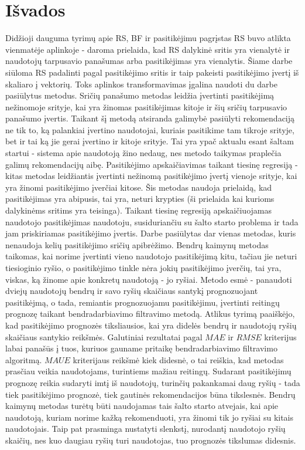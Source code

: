 \documentclass{VUMIFInfMagistrinis}
\begin{document}
\newpage
\section{Išvados}
Didžioji dauguma tyrimų apie RS, BF ir pasitikėjimu pagrįstas RS buvo atlikta vienmatėje aplinkoje - daroma prielaida, kad RS dalykinė sritis yra vienalytė ir naudotojų tarpusavio panašumas arba pasitikėjimas yra vienalytis. Šiame darbe siūloma RS padalinti pagal pasitikėjimo sritis ir taip pakeisti pasitikėjimo įvertį iš skaliaro į vektorių. Toks aplinkos transformavimas įgalina naudoti du darbe pasiūlytus metodus.
\newline
\indent
Sričių panašumo metodas leidžia įvertinti pasitikėjimą nežinomoje srityje, kai yra žinomas pasitikėjimas kitoje ir šių sričių tarpusavio panašumo įvertis. Taikant šį metodą atsiranda galimybė pasiūlyti rekomendaciją ne tik to, ką palankiai įvertino naudotojai, kuriais pasitikime tam tikroje srityje, bet ir tai ką jie gerai įvertino ir kitoje srityje. Tai yra ypač aktualu esant šaltam startui - sistema apie naudotoją žino nedaug, nes metodo taikymas praplečia galimų rekomendacijų aibę.
\newline
\indent
Pasitikėjimo apskaičiavimas taikant tiesinę regresiją - kitas metodas leidžiantis įvertinti nežinomą pasitikėjimo įvertį vienoje srityje, kai yra žinomi pasitikėjimo įverčiai kitose. Šis metodas naudoja prielaidą, kad pasitikėjimas yra abipusis, tai yra, neturi krypties (ši prielaida kai kurioms dalykinėms sritims yra teisinga). Taikant tiesinę regresiją apskaičiuojamas naudotojo pasitikėjimas naudotoju, susiduriančiu su šalto starto problema ir tada jam priskiriamas pasitikėjimo įvertis.
\newline
\indent
Darbe pasiūlytas dar vienas metodas, kuris nenaudoja kelių pasitikėjimo sričių apibrėžimo. Bendrų kaimynų metodas taikomas, kai norime įvertinti vieno naudotojo pasitikėjimą kitu, tačiau jie neturi tiesioginio ryšio, o pasitikėjimo tinkle nėra jokių pasitikėjimo įverčių, tai yra, viskas, ką žinome apie konkretų naudotoją - jo ryšiai. Metodo esmė - panaudoti dviejų naudotojų bendrų ir savo ryšių skaičiaus santykį prognozuojant pasitikėjmą, o tada, remiantis prognozuojamu pasitikėjimu, įvertinti reitingų prognozę taikant bendradarbiavimo filtravimo metodą.
\newline
\indent
Atlikus tyrimą paaiškėjo, kad pasitikėjimo prognozės tiksliausios, kai yra didelės bendrų ir naudotojų ryšių skaičiaus santykio reikšmės. Galutiniai rezultatai pagal $MAE$ ir $RMSE$ kriterijus labai panašūs į tuos, kuriuos gauname pritaikę bendradarbiavimo filtravimo algoritmą. $MAUE$ kriterijaus reikšmė kiek didesnė, o tai reiškia, kad metodas prasčiau veikia naudotojams, turintiems mažiau reitingų. Sudarant pasitikėjimų prognozę reikia sudaryti imtį iš naudotojų, turinčių pakankamai daug ryšių - tada tiek pasitikėjimo prognozė, tiek gautinės rekomendacijos būna tikslesnės. Bendrų kaimynų metodas turėtų būti naudojamas tais šalto starto atvejais, kai apie naudotoją, kuriam norime kažką rekomenduoti, yra žinomi tik jo ryšiai su kitais naudotojais. Taip pat prasminga nustatyti slenkstį, nurodantį naudotojo ryšių skaičių, nes kuo daugiau ryšių turi naudotojas, tuo prognozės tikslumas didesnis.
\end{document}
